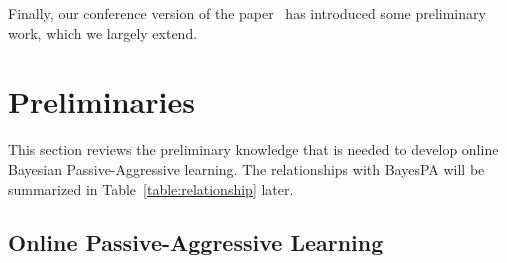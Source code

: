 \documentclass[twoside,11pt]{article}
\newcommand{\junx}[1]{{\color{red}{\bf\sf #1}}}
\begin{document}
Finally, our conference version of the paper~\citep{shi2014bayespa} has introduced some preliminary work, which we largely extend.


\section{Preliminaries}\label{sec:pre}

This section reviews the preliminary knowledge that is needed to develop online Bayesian Passive-Aggressive learning. The relationships with BayesPA will be summarized in Table~\ref{table:relationship} later.

\subsection{Online Passive-Aggressive Learning}\label{sec:pa}
\end{document}
